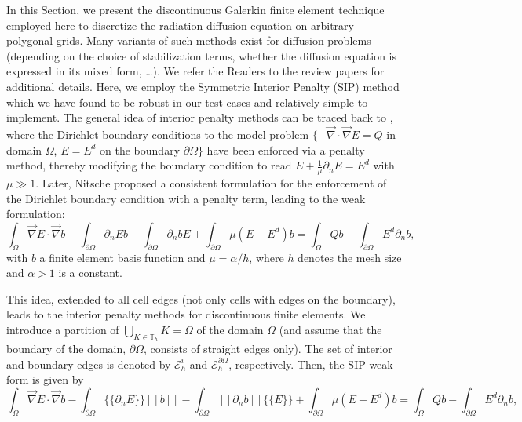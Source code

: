 \documentclass[preprint,10pt]{elsarticle}
\renewcommand{\div}{\vec{\nabla}\! \cdot \!}
\newcommand{\grad}{\vec{\nabla}}
\newcommand{\jmp}[1]{[\![#1]\!]}                     %
\newcommand{\mvl}[1]{\{\!\!\{#1\}\!\!\}}             %
\newcommand{\tf}{b}
\renewcommand{\(}{\left(}
\renewcommand{\)}{\right)}
\renewcommand{\[}{\left[}
\renewcommand{\]}{\right]}
\begin{document}
In this Section, we present the discontinuous Galerkin finite element technique employed here to
discretize the radiation diffusion equation on arbitrary polygonal grids. Many variants of such
methods exist for diffusion problems (depending on the choice of stabilization terms, whether 
the diffusion equation is expressed in its mixed form, \ldots). We refer the Readers to the review
papers \cite{unification,brezzi etc} for additional details. Here, we employ the Symmetric
Interior Penalty (SIP) method which we have found to be robust in our test cases and relatively simple 
to implement.
The general idea of interior penalty methods can be traced back to \cite{lions1968}, where the Dirichlet
boundary conditions to the model problem $\{-\div \grad E = Q$ in domain $\Omega$, $E=E^d$ on 
the boundary $\partial \Omega\}$ have been enforced via a penalty method, thereby modifying the 
boundary condition to read $E+\frac{1}{\mu}\partial_n E = E^d$ with $\mu\gg 1$. Later, 
Nitsche \cite{nitsche1971} proposed a consistent formulation for the enforcement of the 
Dirichlet boundary condition with a penalty term, leading to the weak formulation:
\begin{equation}
\label{eq:penalty_nitsche}
\int_{\Omega} \grad E \cdot \grad \tf
- \int_{\partial\Omega} \partial_n E \tf  
- \int_{\partial\Omega} \partial_n \tf E 
+ \int_{\partial\Omega} \mu(E-E^d) \tf 
=
\int_{\Omega} Q \tf 
- \int_{\partial\Omega} E^d \partial_n \tf ,
\end{equation}
with $\tf$ a finite element basis function and $\mu=\alpha/h$, where $h$ denotes 
the mesh size and $\alpha>1$ is a constant.

This idea, extended to all cell edges (not only cells with edges on the boundary), leads
to the interior penalty methods for discontinuous finite elements. We introduce a partition
of $\bigcup\nolimits_{K\in \mathbb{T}_{h}}K=\Omega$ of the domain $\Omega$ (and assume
that the boundary of the domain, $\partial \Omega$, consists of straight edges only). The 
set of interior and boundary edges is denoted by $\mathcal{E}_h^i$ and $\mathcal{E}_h^{\partial\Omega}$,
respectively.  Then, the SIP weak form is given by
\begin{equation}
\label{eq:penalty_nitsche}
\int_{\Omega} \grad E \cdot \grad \tf
- \int_{\partial\Omega} \mvl{\partial_n E} \jmp{\tf}  
- \int_{\partial\Omega} \jmp{\partial_n \tf} \mvl{E} 
+ \int_{\partial\Omega} \mu(E-E^d) \tf 
=
\int_{\Omega} Q \tf 
- \int_{\partial\Omega} E^d \partial_n \tf ,
\end{equation}
\end{document}
